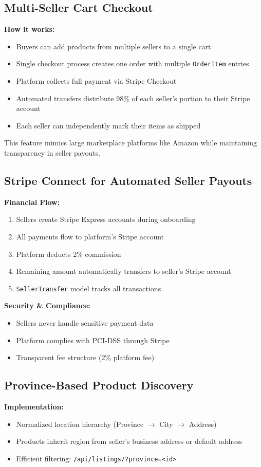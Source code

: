 \documentclass[12pt,a4paper]{article}
\begin{document}
\subsection{Multi-Seller Cart Checkout}
\textbf{How it works:}
\begin{itemize}
    \item Buyers can add products from multiple sellers to a single cart
    \item Single checkout process creates one order with multiple \texttt{OrderItem} entries
    \item Platform collects full payment via Stripe Checkout
    \item Automated transfers distribute 98\% of each seller's portion to their Stripe account
    \item Each seller can independently mark their items as shipped
\end{itemize}

This feature mimics large marketplace platforms like Amazon while maintaining transparency in seller payouts.

\subsection{Stripe Connect for Automated Seller Payouts}
\textbf{Financial Flow:}
\begin{enumerate}
    \item Sellers create Stripe Express accounts during onboarding
    \item All payments flow to platform's Stripe account
    \item Platform deducts 2\% commission
    \item Remaining amount automatically transfers to seller's Stripe account
    \item \texttt{SellerTransfer} model tracks all transactions
\end{enumerate}

\textbf{Security \& Compliance:}
\begin{itemize}
    \item Sellers never handle sensitive payment data
    \item Platform complies with PCI-DSS through Stripe
    \item Transparent fee structure (2\% platform fee)
\end{itemize}

\subsection{Province-Based Product Discovery}
\textbf{Implementation:}
\begin{itemize}
    \item Normalized location hierarchy (Province $\rightarrow$ City $\rightarrow$ Address)
    \item Products inherit region from seller's business address or default address
    \item Efficient filtering: \texttt{/api/listings/?province=<id>}
\end{itemize}
\end{document}
